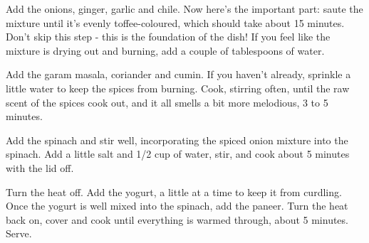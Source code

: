 {{            Add the onions, ginger, garlic and chile.
            Now here's the important part: saute the mixture until it's evenly toffee-coloured, which should take about 15 minutes.
            Don't skip this step - this is the foundation of the dish!
            If you feel like the mixture is drying out and burning, add a couple of tablespoons of water.
        \item Add the garam masala, coriander and cumin.
            If you haven't already, sprinkle a little water to keep the spices from burning.
            Cook, stirring often, until the raw scent of the spices cook out, and it all smells a bit more melodious, 3 to 5 minutes.
        \item Add the spinach and stir well, incorporating the spiced onion mixture into the spinach.
            Add a little salt and 1/2 cup of water, stir, and cook about 5 minutes with the lid off.
        \item Turn the heat off.
            Add the yogurt, a little at a time to keep it from curdling.
            Once the yogurt is well mixed into the spinach, add the paneer.
            Turn the heat back on, cover and cook until everything is warmed through, about 5 minutes. Serve.
    }
}
